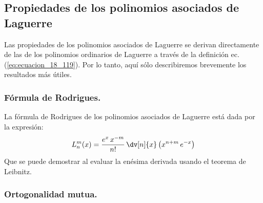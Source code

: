 \subsection{Propiedades de los polinomios asociados de Laguerre}

Las propiedades de los polinomios asociados de Laguerre se derivan directamente de las de los polinomios ordinarios de Laguerre a través de la definición ec. (\ref{eq:ecuacion_18_119}). Por lo tanto, aquí sólo describiremos brevemente los resultados más útiles.

\subsubsection{Fórmula de Rodrigues.}

La fórmula de Rodrigues de los polinomios asociados de Laguerre está dada por la expresión:
\begin{align}
L_{n}^{m} (x) = \dfrac{e^{x} \, x^{-m}}{n!} \, \dv[n]{x} \left( x^{n+m} \, e^{-x} \right)
\label{eq:ecuacion_18_121}
\end{align}
Que se puede demostrar al evaluar la enésima derivada usando el teorema de Leibnitz.

\subsubsection{Ortogonalidad mutua.}

